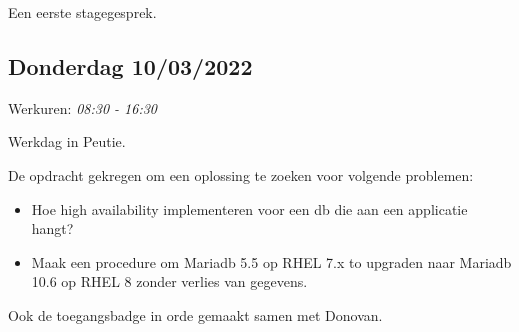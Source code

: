 Een eerste stagegesprek.

\hypertarget{donderdag-10032022}{%
\subsection{Donderdag 10/03/2022}\label{donderdag-10032022}}

Werkuren: \emph{08:30 - 16:30}

Werkdag in Peutie.

De opdracht gekregen om een oplossing te zoeken voor volgende problemen:

\begin{itemize}
\tightlist
\item
  Hoe high availability implementeren voor een db die aan een applicatie
  hangt?
\item
  Maak een procedure om Mariadb 5.5 op RHEL 7.x to upgraden naar Mariadb
  10.6 op RHEL 8 zonder verlies van gegevens.
\end{itemize}

Ook de toegangsbadge in orde gemaakt samen met Donovan.

